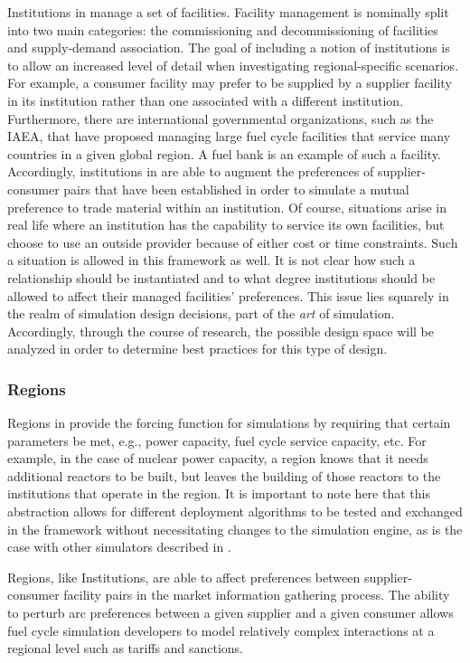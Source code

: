Institutions in \Cyclus manage a set of facilities. Facility management is
nominally split into two main categories: the commissioning and decommissioning
of facilities and supply-demand association. The goal of including a notion of
institutions is to allow an increased level of detail when investigating
regional-specific scenarios. For example, a consumer facility may prefer to be
supplied by a supplier facility in its institution rather than one associated with
a different institution. Furthermore, there are international governmental
organizations, such as the IAEA, that have proposed managing large fuel cycle
facilities that service many countries in a given global region. A fuel bank is
an example of such a facility. Accordingly, institutions in \Cyclus are able to
augment the preferences of supplier-consumer pairs that have been established in
order to simulate a mutual preference to trade material within an
institution. Of course, situations arise in real life where an institution has
the capability to service its own facilities, but choose to use an outside
provider because of either cost or time constraints. Such a situation is allowed
in this framework as well. It is not clear how such a relationship should be
instantiated and to what degree institutions should be allowed to affect their
managed facilities' preferences. This issue lies squarely in the realm of
simulation design decisions, part of the \textit{art} of
simulation. Accordingly, through the course of research, the possible design
space will be analyzed in order to determine best practices for this type of
design.

\subsubsection{Regions}

Regions in \Cyclus provide the forcing function for simulations by requiring
that certain parameters be met, e.g., power capacity, fuel cycle service
capacity, etc. For example, in the case of nuclear power capacity, a region
knows that it needs additional reactors to be built, but leaves the building of
those reactors to the institutions that operate in the region. It is important
to note here that this abstraction allows for different deployment algorithms to
be tested and exchanged in the \Cyclus framework without necessitating changes
to the simulation engine, as is the case with other simulators described in
.

Regions, like Institutions, are able to affect preferences between
supplier-consumer facility pairs in the market information gathering
process. The ability to perturb arc preferences between a given supplier and a
given consumer allows fuel cycle simulation developers to model relatively
complex interactions at a regional level such as tariffs and sanctions.

